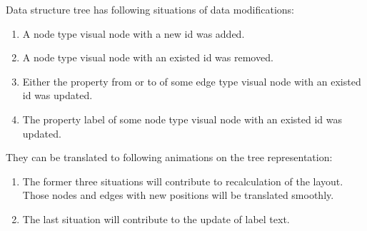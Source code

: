 Data structure tree has following situations of data modifications:
\begin {enumerate}
\item A node type visual node with a new id was added.
\item A node type visual node with an existed id was removed.
\item Either the property from or to of some edge type visual node with an existed id was updated.
\item The property label of some node type visual node with an existed id was updated.
\end {enumerate}

They can be translated to following animations on the tree representation:
\begin {enumerate}
\item The former three situations will contribute to recalculation of the layout. Those nodes and edges with new positions will be translated smoothly.
\item The last situation will contribute to the update of label text.
\end {enumerate}

